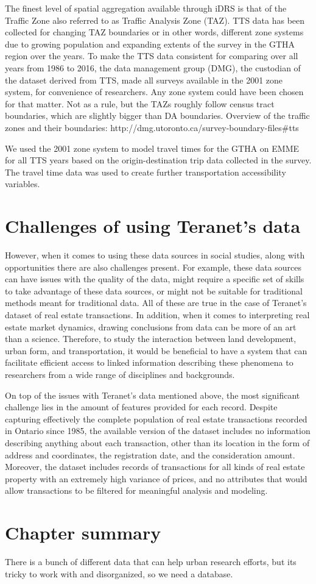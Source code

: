 The finest level of spatial aggregation available through iDRS is that of the Traffic Zone also referred to as Traffic Analysis Zone (TAZ).
TTS data has been collected for changing TAZ boundaries or in other words, different zone systems due to growing population and expanding extents of the survey in the GTHA region over the years.
To make the TTS data consistent for comparing over all years from 1986 to 2016, the data management group (DMG), the custodian of the dataset derived from TTS, made all surveys available in the 2001 zone system, for convenience of researchers.
Any zone system could have been chosen for that matter.
Not as a rule, but the TAZs roughly follow census tract boundaries, which are slightly bigger than DA boundaries.
Overview of the traffic zones and their boundaries: http://dmg.utoronto.ca/survey-boundary-files#tts

We used the 2001 zone system to model travel times for the GTHA on EMME for all TTS years based on the origin-destination trip data collected in the survey. The travel time data was used to create further transportation accessibility variables.


\section{Challenges of using Teranet's data} \label{sec:challenges}
However, when it comes to using these data sources in social studies, along with opportunities there are also challenges present.
For example, these data sources can have issues with the quality of the data, might require a specific set of skills to take advantage of these data sources, or might not be suitable for traditional methods meant for traditional data\cite{Arribas-Bel2014}.
All of these are true in the case of Teranet's dataset of real estate transactions.
In addition, when it comes to interpreting real estate market dynamics, drawing conclusions from data can be more of an art than a science.\cite{Brett2009}
Therefore, to study the interaction between land development, urban form, and transportation, it would be beneficial to have a system that can facilitate efficient access to linked information describing these phenomena to researchers from a wide range of disciplines and backgrounds.

On top of the issues with Teranet's data mentioned above, the most significant challenge lies in the amount of features provided for each record.
Despite capturing effectively the complete population of real estate transactions recorded in Ontario since 1985, the available version of the dataset includes no information describing anything about each transaction, other than its location in the form of address and coordinates, the registration date, and the consideration amount.
Moreover, the dataset includes records of transactions for all kinds of real estate property with an extremely high variance of prices, and no attributes that would allow transactions to be filtered for meaningful analysis and modeling.

\section{Chapter summary} \label{sec:background_summary}
There is a bunch of different data that can help urban research efforts, but its tricky to work with and disorganized, so we need a database.
